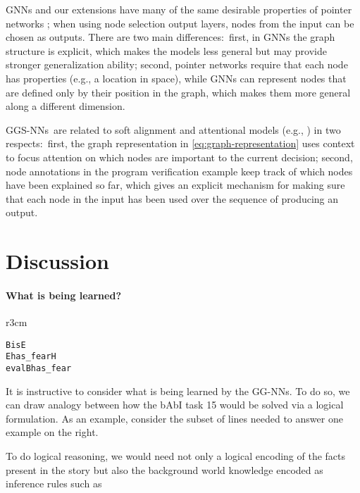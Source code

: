\documentclass{article} \usepackage{iclr2016_conference,times}
\newcommand{\OurMethodMinorShort}{GG-NN}
\newcommand{\OurMethodMinorShorts}{\OurMethodMinorShort s}
\newcommand{\OurMethodShort}{GGS-NN}
\newcommand{\OurMethodShorts}{\OurMethodShort s}
\begin{document}
GNNs and our extensions have many of the same desirable properties of
pointer networks \citep{vinyals2015pointer};  when using
node selection output layers, nodes from the input can be chosen as outputs.
There are two main differences:~first,
in GNNs the graph structure is explicit, which makes the models less general
but may provide stronger generalization ability; 
second, pointer networks require that each node has
properties (e.g., a location in space), while GNNs can represent
nodes that are defined only by their position in the graph, which 
makes them more general along a different dimension.

\OurMethodShorts~are related to soft alignment and attentional models
(e.g., \cite{bahdanau2014neural,kumar2015ask,sukhbaatar2015end}) in two respects:~first, the graph
representation in \eqref{eq:graph-representation} uses context to
focus attention on which nodes are important to the current decision;
second, node annotations in the program verification example keep
track of which nodes have been explained so far, which gives an
explicit mechanism for making sure that each node in the input
has been used over the sequence of producing an output.




\section{Discussion}
\label{sec:discussion}

\paragraph{What is being learned?}

\begin{wrapfigure}[4]{r}{3cm}
\small\vspace{-4ex}
\begin{alltt}
 B is E
 E has_fear H
 eval B has_fear
\end{alltt}
\end{wrapfigure}
It is instructive to consider what is being learned by the
\OurMethodMinorShorts. To do so, we can draw analogy between how the bAbI task 15
would be solved via
a logical formulation. As an example, consider the subset of lines
needed to answer one example on the right.



To do logical reasoning, we would need not only a logical encoding of
the facts present in the story but also the background world knowledge encoded as
inference rules such as 
\end{document}
